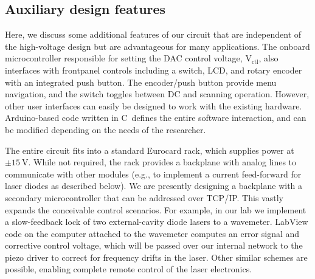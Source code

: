 \documentclass[aip,rsi,reprint]{revtex4-1} %
\newcommand{\CC}{{C\nolinebreak[4]\hspace{-.05em}\raisebox{.4ex}{\tiny\bf ++}}~}
\begin{document}
\subsection{Auxiliary design features}
\label{Sec:AuxDesign}

Here, we discuss some additional features of our circuit that are independent of the high-voltage design but are advantageous for many applications.
The onboard microcontroller responsible for setting the DAC control voltage, $\text{V}_\text{ctl}$, also interfaces with frontpanel controls including a switch, LCD, and rotary encoder with an integrated push button.
The encoder/push button provide menu navigation, and the switch toggles between DC and scanning operation.
However, other user interfaces can easily be designed to work with the existing hardware.
Arduino-based code written in \CC defines the entire software interaction, and can be modified depending on the needs of the researcher.

The entire circuit fits into a standard Eurocard rack, which supplies power at $\pm\SI{15}{\volt}$.
While not required, the rack provides a backplane with analog lines to communicate with other modules (e.g., to implement a current feed-forward for laser diodes as described below).
We are presently designing a backplane with a secondary microcontroller that can be addressed over TCP/IP.
This vastly expands the conceivable control scenarios. 
For example, in our lab we implement a slow-feedback lock of two external-cavity diode lasers to a wavemeter.
LabView code on the computer attached to the wavemeter computes an error signal and corrective control voltage, which will be passed over our internal network to the piezo driver to correct for frequency drifts in the laser.
Other similar schemes are possible, enabling complete remote control of the laser electronics.
\end{document}
